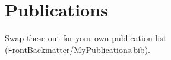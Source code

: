 \chapter*{Publications}
Swap these out for your own publication list ({\texttt FrontBackmatter/MyPublications.bib}).

\begin{refsection}[ownpubs]
    \small
    \nocite{*} %
    \printbibliography[heading=none]
\end{refsection}

